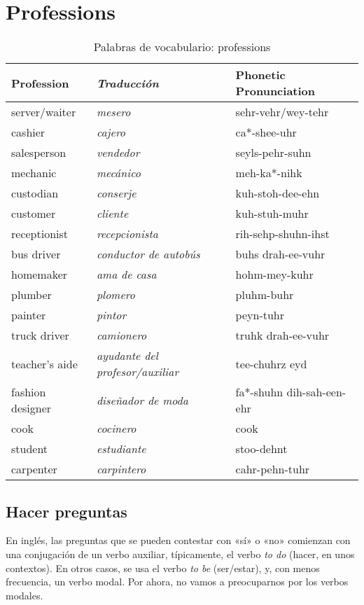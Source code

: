 \chapter{Professions}

\begin{table}[H]
	\centering
	\begin{tabular}{lll}
	\toprule
		\textbf{Profession} & \textbf{\emph{Traducci\'on}} & \textbf{Phonetic Pronunciation}\\
	\midrule
		server/waiter & \emph{mesero} & sehr-vehr/wey-tehr \\
		cashier & \emph{cajero} & ca*-shee-uhr \\
		salesperson & \emph{vendedor} & seyls-pehr-suhn \\
		mechanic & \emph{mecánico} & meh-ka*-nihk \\
		custodian & \emph{conserje} & kuh-stoh-dee-ehn \\
		customer & \emph{cliente} & kuh-stuh-muhr \\
		receptionist & \emph{recepcionista} & rih-sehp-shuhn-ihst \\
		bus driver & \emph{conductor de autobús} & buhs drah-ee-vuhr \\
		homemaker & \emph{ama de casa} & hohm-mey-kuhr \\
		plumber & \emph{plomero} & pluhm-buhr\\
		painter & \emph{pintor} & peyn-tuhr \\
		truck driver & \emph{camionero} & truhk drah-ee-vuhr \\
		teacher's aide & \emph{ayudante del profesor/auxiliar} & tee-chuhrz eyd \\
		fashion designer & \emph{diseñador de moda} & fa*-shuhn dih-sah-een-ehr \\
		cook & \emph{cocinero} & cook \\
		student & \emph{estudiante} & stoo-dehnt \\
		carpenter & \emph{carpintero} & cahr-pehn-tuhr \\
	\bottomrule
	\end{tabular}
	\caption{Palabras de vocabulario: professions}
\end{table}

\section{Hacer preguntas}%
\label{sec:Hacer preguntas}

En ingl\'es, las preguntas que se pueden contestar con «s\'i» o «no» comienzan con una conjugaci\'on de un verbo auxiliar, t\'ipicamente, el verbo \emph{to do} (hacer, en unos contextos).
En otros casos, se usa el verbo \emph{to be} (ser/estar), y, con menos frecuencia, un verbo modal.
Por ahora, no vamos a preocuparnos por los verbos modales.\\

